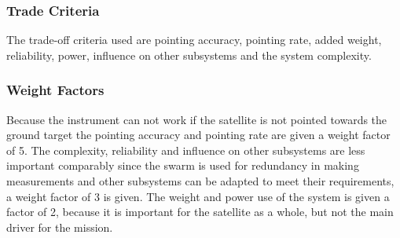 \subsubsection{Trade Criteria}
The trade-off criteria used are pointing accuracy, pointing rate, added weight, reliability, power, influence on other subsystems and the system complexity.

\subsubsection{Weight Factors}
Because the instrument can not work if the satellite is not pointed towards the ground target the pointing accuracy and pointing rate are given a weight factor of 5. The complexity, reliability and influence on other subsystems are less important comparably since the swarm is used for redundancy in making measurements and other subsystems can be adapted to meet their requirements, a weight factor of 3 is given. The weight and power use of the system is given a factor of 2, because it is important for the satellite as a whole, but not the main driver for the mission.

